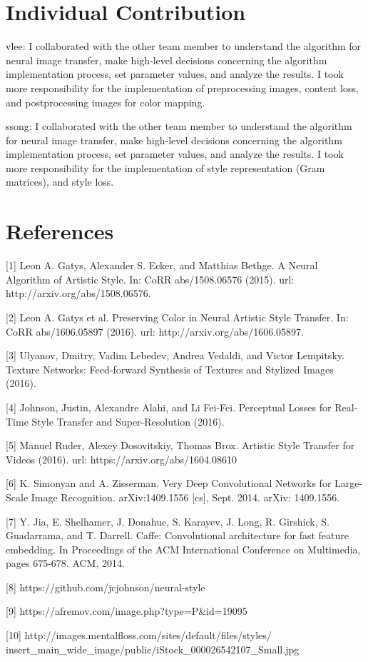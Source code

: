\documentclass[10pt,twocolumn,letterpaper]{article}
\begin{document}
\section{Individual Contribution}

vlee: I collaborated with the other team member to understand the algorithm for neural image transfer, make high-level decisions concerning the algorithm implementation process, set parameter values, and analyze the results. I took more responsibility for the implementation of preprocessing images, content loss, and postprocessing images for color mapping.

ssong: I collaborated with the other team member to understand the algorithm for neural image transfer, make high-level decisions concerning the algorithm implementation process, set parameter values, and analyze the results. I took more responsibility for the implementation of style representation (Gram matrices), and style loss.

\section{References}

[1] Leon A. Gatys, Alexander S. Ecker, and Matthias Bethge. A Neural Algorithm of Artistic Style. In: CoRR abs/1508.06576 (2015). url: http://arxiv.org/abs/1508.06576.

[2] Leon A. Gatys et al. Preserving Color in Neural Artistic Style Transfer. In: CoRR abs/1606.05897 (2016). url: http://arxiv.org/abs/1606.05897.

[3] Ulyanov, Dmitry, Vadim Lebedev, Andrea Vedaldi, and Victor Lempitsky. Texture Networks: Feed-forward Synthesis of Textures and Stylized Images (2016).

[4] Johnson, Justin, Alexandre Alahi, and Li Fei-Fei. Perceptual Losses for Real-Time Style Transfer and Super-Resolution (2016).

[5] Manuel Ruder, Alexey Dosovitskiy, Thomas Brox. Artistic Style Transfer for Videos (2016). url: https://arxiv.org/abs/1604.08610

[6] K. Simonyan and A. Zisserman. Very Deep Convolutional Networks for Large-Scale Image Recognition. arXiv:1409.1556 [cs], Sept. 2014. arXiv: 1409.1556.

[7] Y. Jia, E. Shelhamer, J. Donahue, S. Karayev, J. Long, R. Girshick, S. Guadarrama, and T. Darrell. Caffe: Convolutional
architecture for fast feature embedding. In Proceedings of the ACM International Conference on Multimedia, pages 675-678. ACM, 2014.

[8] https://github.com/jcjohnson/neural-style

[9] https://afremov.com/image.php?type=P\&id=19095

[10] http://images.mentalfloss.com/sites/default/files/styles/
insert\_main\_wide\_image/public/iStock\_000026542107\_Small.jpg

{\small


}
\end{document}
